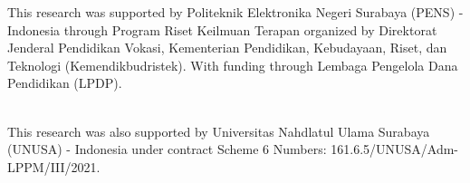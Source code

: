 
\begin{acknowledgements}      

\noindent This research was supported by Politeknik Elektronika Negeri Surabaya (PENS) -
Indonesia through Program Riset Keilmuan Terapan organized by Direktorat Jenderal Pendidikan Vokasi, Kementerian Pendidikan, Kebudayaan, Riset, dan Teknologi (Kemendikbudristek). 
With funding through Lembaga Pengelola Dana Pendidikan (LPDP). 
\begin{table}[h!]
    \centering
\end{table}\\
This research was also supported by Universitas Nahdlatul Ulama Surabaya (UNUSA) -
Indonesia under contract Scheme 6 Numbers:
161.6.5/UNUSA/Adm-LPPM/III/2021.



\end{acknowledgements}
